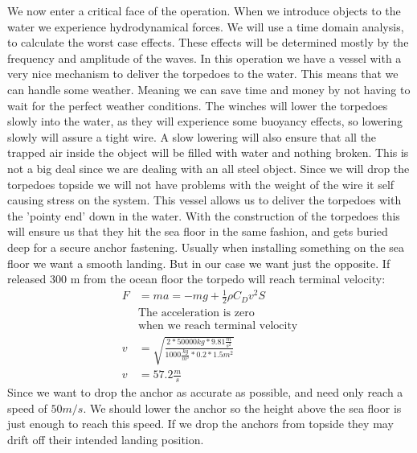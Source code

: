 \documentclass[DIV=calc, paper=a4, fontsize=13pt, twocolumn]{scrartcl}	 %
\begin{document}
We now enter a critical face of the operation. When we introduce objects to the water we experience hydrodynamical forces. We will use a time domain analysis, to calculate the worst case effects. These effects will be determined mostly by the frequency and amplitude of the waves. In this operation we have a vessel with a very nice mechanism to deliver the torpedoes to the water. This means that we can handle some weather. Meaning we can save time and money by not having to wait for the perfect weather conditions.
The winches will lower the torpedoes slowly into the water, as they will experience some buoyancy effects, so lowering slowly will assure a tight wire. A slow lowering will also ensure that all the trapped air inside the object will be filled with water and nothing broken. This is not a big deal since we are dealing with an all steel object. Since we will drop the torpedoes topside we will not have problems with the weight of the wire it self causing stress on the system. 
This vessel allows us to deliver the torpedoes with the 'pointy end' down in the water. With the construction of the torpedoes this will ensure us that they hit the sea floor in the same fashion, and gets buried deep for a secure anchor fastening.
\newline 
Usually when installing something on the sea floor we want a smooth landing. But in our case we want just the opposite. 
If released 300 m from the ocean floor the torpedo will reach terminal velocity:
\begin{align}
F &= ma = -mg + \frac{1}{2} \rho C_D v^2 S \\
&\text{The acceleration is zero} \\
&\text{when we reach terminal velocity} \\
v &= \sqrt{\frac{2 * 50 000 kg * 9.81 \frac{m}{s^2}}{1000\frac{kg}{m^3} * 0.2 * 1.5 m^2}} \\
v &= 57.2 \frac{m}{s}
\end{align}
Since we want to drop the anchor as accurate as possible, and need only reach a speed of $50 m/s$. We should lower the anchor so the height above the sea floor is just enough to reach this speed. If we drop the anchors from topside they may drift off their intended landing position. 
\newline
\end{document}
